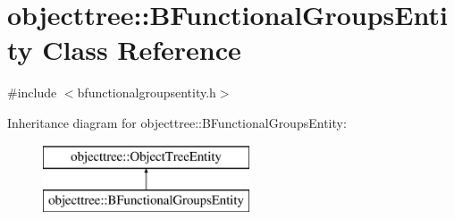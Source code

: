 \hypertarget{classobjecttree_1_1_b_functional_groups_entity}{}\section{objecttree\+::B\+Functional\+Groups\+Entity Class Reference}
\label{classobjecttree_1_1_b_functional_groups_entity}


{\ttfamily \#include $<$bfunctionalgroupsentity.\+h$>$}

Inheritance diagram for objecttree\+::B\+Functional\+Groups\+Entity\+:\begin{figure}[H]
\begin{center}
\leavevmode
\includegraphics[height=2.000000cm]{d6/dca/classobjecttree_1_1_b_functional_groups_entity}
\end{center}
\end{figure}
